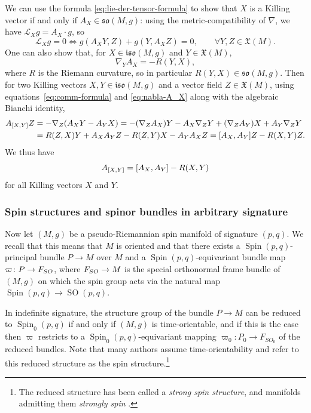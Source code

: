 \documentclass[11pt]{article}
\numberwithin{equation}{section}
\numberwithin{equation}{section}
\newcommand{\fso}{\mathfrak{so}}
\newcommand{\fiso}{\mathfrak{iso}}
\newcommand{\fX}{\mathfrak{X}}
\newcommand{\eL}{\mathscr{L}}
\newcommand{\1}{\mathbbm{1}}
\DeclareMathOperator{\Spin}{Spin}
\DeclareMathOperator{\SO}{SO}
\begin{document}
We can use the formula \eqref{eq:lie-der-tensor-formula} to show that $X$ is a Killing vector if and only if $A_X\in\fso(M,g)$: using the metric-compatibility of $\nabla$, we have $\eL_X g = A_X\cdot g$, so
\begin{equation}\label{eq:killing-condition}
	\eL_X g = 0 \iff g(A_X Y, Z) + g(Y,A_X Z) = 0,\qquad\forall Y,Z\in\fX(M).
\end{equation}
One can also show \cite[Lemma~2.2]{Kostant1955} that, for $X\in\fiso(M,g)$ and $Y\in\fX(M)$,
\begin{equation}\label{eq:nabla-A_X}
	\nabla_Y A_X = -R(Y,X),
\end{equation}
where $R$ is the Riemann curvature, so in particular $R(Y,X)\in\fso(M,g)$. Then for two Killing vectors $X,Y\in\fiso(M,g)$ and a vector field $Z\in\fX(M)$, using equations~\eqref{eq:comm-formula} and \eqref{eq:nabla-A_X} along with the algebraic Bianchi identity,
\begin{align*}
	A_{\comm{X}{Y}}Z
		&= -\nabla_Z\qty(A_X Y - A_Y X)= -(\nabla_ZA_X)Y - A_X\nabla_ZY + (\nabla_ZA_Y)X + A_Y\nabla_ZY\\
		&= R(Z,X)Y + A_XA_YZ - R(Z,Y)X- A_YA_XZ= \comm{A_X}{A_Y}Z - R(X,Y)Z.
\end{align*}
We thus have
\begin{equation}\label{eq:A-comm}
	A_{\comm{X}{Y}} = \comm{A_X}{A_Y} - R(X,Y)
\end{equation}
for all Killing vectors $X$ and $Y$.

\subsubsection{Spin structures and spinor bundles in arbitrary signature}
\label{sec:spin-structures}

Now let $(M,g)$ be a pseudo-Riemannian spin manifold of signature $(p,q)$. We recall that this means that $M$ is oriented and that there exists a $\Spin(p,q)$-principal bundle $P\to M$ over $M$ and a $\Spin(p,q)$-equivariant bundle map $\varpi\colon P\to F_{\rm SO}$, where $F_{\rm SO}\to M$ is the special orthonormal frame bundle of $(M,g)$ on which the spin group acts via the natural map $\Spin(p,q)\to\SO(p,q)$.

In indefinite signature, the structure group of the bundle $P\to M$ can be reduced to $\Spin_0(p,q)$ if and only if $(M,g)$ is time-orientable, and if this is the case then $\varpi$ restricts to a $\Spin_0(p,q)$-equivariant mapping $\varpi_0\colon P_0\to F_{SO_0}$ of the reduced bundles. Note that many authors assume time-orientability and refer to this reduced structure as the spin structure.\footnote{The reduced structure has been called a \emph{strong spin structure}, and manifolds admitting them \emph{strongly spin} \cite{Cortes2021,Shahbazi2024_2,Shahbazi2024_1}.}
	
\end{document}
